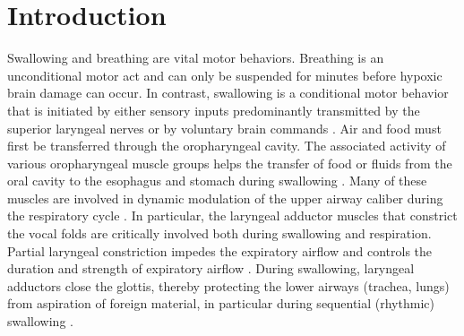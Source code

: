 \documentclass[pdflatex,sn-mathphys-ay]{sn-jnl}%
\theoremstyle{thmstyleone}%
\theoremstyle{thmstyletwo}%
\theoremstyle{thmstylethree}%
\begin{document}
\section{Introduction}\label{sec: introduction}
Swallowing and breathing are vital motor behaviors. Breathing is an unconditional motor act and can only be suspended for minutes before hypoxic brain damage can occur. In contrast, swallowing is a conditional motor behavior that is initiated by either sensory inputs predominantly transmitted by the superior laryngeal nerves \citep{miller1974anatomical, jafari2003sensory, hashimoto2019activity, sang2001swallowing} or by voluntary brain commands \citep{mosier2001parallel,ludlow2015central, wei2024cortical, trevizan2024neuroanatomical}. Air and food must first be transferred through the oropharyngeal cavity. The associated activity of various oropharyngeal muscle groups helps the transfer of food or fluids from the oral cavity to the esophagus and stomach during swallowing \citep{miller1986neurophysiological, sejdic2018computational, allen2012deglutition, jean2001brain}. Many of these muscles are involved in dynamic modulation of the upper airway caliber during the respiratory cycle \citep{bartlett1989respiratory, dutschmann2002glycinergic, dutschmann2014physiological, bolser2013central, bautista2014generation}. In particular, the laryngeal adductor muscles that constrict the vocal folds are critically involved both during swallowing and respiration. Partial laryngeal constriction impedes the expiratory airflow and controls the duration and strength of expiratory airflow \citep{harding1984perinatal, bartlett2011upper, dutschmann2002influence, dutschmann2002glycinergic, dutschmann2006kolliker, dutschmann2014physiological}. During swallowing, laryngeal adductors close the glottis, thereby protecting the lower airways (trachea, lungs) from aspiration of foreign material, in particular during sequential (rhythmic) swallowing \citep{bolser2006neurogenesis,bolser2015role, dutschmann2014physiological}. 
\end{document}
